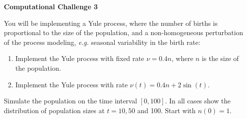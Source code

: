 \documentclass[12pt]{article}
\begin{document}
\begin{center}
{\Large \bf Computational Challenge 3
\\ \vskip5mm  }
\end{center}

You will be implementing a Yule process, where the number of births is proportional to the size of the population, and a non-homogeneous perturbation of the process modeling, \emph{e.g.} seasonal variability in the birth rate:

\begin{enumerate}
	\item Implement the Yule process with fixed rate $\nu = 0.4n$, where $n$ is the size of the population.
	\item Implement the Yule process with rate $\nu (t) = 0.4n + 2 \sin(t)$.
\end{enumerate}

Simulate the population on the time interval $[0, 100]$. In all cases show the distribution of population sizes at $t = 10, 50$ and 100. Start with $n(0) = 1$.
\end{document}
